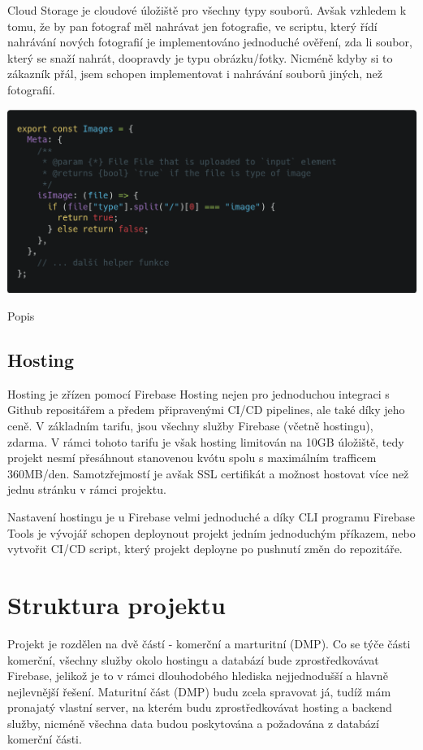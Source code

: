 \documentclass[12pt,a4paper]{report}
\begin{document}
  Cloud Storage je cloudové úložiště pro všechny typy souborů. Avšak vzhledem k tomu, že by pan
  fotograf měl nahrávat jen fotografie, ve scriptu, který řídí nahrávání nových fotografií je
  implementováno jednoduché ověření, zda li soubor, který se snaží nahrát, doopravdy je typu
  obrázku/fotky. Nicméně kdyby si to zákazník přál, jsem schopen implementovat i nahrávání
  souborů jiných, než fotografií.

  \vspace*{0.5cm}
  \noindent\includegraphics[width=\linewidth]{imagesHelperCodeblock.png}
  \begin{center}
    Popis
  \end{center}
  \vspace*{0.5cm}

  \section{Hosting}
  Hosting je zřízen pomocí Firebase Hosting nejen pro jednoduchou integraci s Github repositářem
  a předem připravenými CI/CD pipelines, ale také díky jeho ceně. V základním tarifu, jsou všechny služby
  Firebase (včetně hostingu), zdarma. V rámci tohoto tarifu je však hosting limitován na 10GB úložiště, tedy projekt 
  nesmí přesáhnout stanovenou kvótu spolu s maximálním trafficem 360MB/den. Samotzřejmostí je avšak SSL certifikát a možnost
  hostovat více než jednu stránku v rámci projektu.

  Nastavení hostingu je u Firebase velmi jednoduché a díky CLI programu Firebase Tools je vývojář schopen
  deploynout projekt jedním jednoduchým příkazem, nebo vytvořit CI/CD script, který projekt deployne po pushnutí změn do repozitáře. 

  \chapter{Struktura projektu}
  Projekt je rozdělen na dvě částí - komerční a marturitní (DMP). Co se týče části komerční, všechny
  služby okolo hostingu a databází bude zprostředkovávat Firebase, jelikož je to v rámci
  dlouhodobého hlediska nejjednodušší a hlavně nejlevnější řešení. Maturitní část (DMP) budu zcela
  spravovat já, tudíž mám pronajatý vlastní server, na kterém budu zprostředkovávat hosting a
  backend služby, nicméně všechna data budou poskytována a požadována z databází komerční
  části.
 
\end{document}
